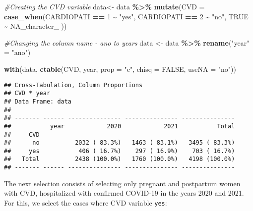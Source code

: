 \documentclass[
]{article}
\newenvironment{Shaded}{\begin{snugshade}}{\end{snugshade}}
\newcommand{\AttributeTok}[1]{\textcolor[rgb]{0.13,0.29,0.53}{#1}}
\newcommand{\CommentTok}[1]{\textcolor[rgb]{0.56,0.35,0.01}{\textit{#1}}}
\newcommand{\ConstantTok}[1]{\textcolor[rgb]{0.56,0.35,0.01}{#1}}
\newcommand{\DecValTok}[1]{\textcolor[rgb]{0.00,0.00,0.81}{#1}}
\newcommand{\FunctionTok}[1]{\textcolor[rgb]{0.13,0.29,0.53}{\textbf{#1}}}
\newcommand{\NormalTok}[1]{#1}
\newcommand{\OtherTok}[1]{\textcolor[rgb]{0.56,0.35,0.01}{#1}}
\newcommand{\SpecialCharTok}[1]{\textcolor[rgb]{0.81,0.36,0.00}{\textbf{#1}}}
\newcommand{\StringTok}[1]{\textcolor[rgb]{0.31,0.60,0.02}{#1}}
\begin{document}
\begin{Shaded}
\begin{Highlighting}[]
\CommentTok{\#Creating the CVD variable}
\NormalTok{data}\OtherTok{\textless{}{-}}\NormalTok{ data }\SpecialCharTok{\%\textgreater{}\%} 
  \FunctionTok{mutate}\NormalTok{(}\AttributeTok{CVD =} \FunctionTok{case\_when}\NormalTok{(CARDIOPATI }\SpecialCharTok{==} \DecValTok{1} \SpecialCharTok{\textasciitilde{}} \StringTok{"yes"}\NormalTok{, CARDIOPATI }\SpecialCharTok{==} \DecValTok{2} \SpecialCharTok{\textasciitilde{}} \StringTok{"no"}\NormalTok{,   }\ConstantTok{TRUE} \SpecialCharTok{\textasciitilde{}} \ConstantTok{NA\_character\_}\NormalTok{ ))}

\CommentTok{\#Changing the column name {-} ano to years}
\NormalTok{data }\OtherTok{\textless{}{-}}\NormalTok{ data }\SpecialCharTok{\%\textgreater{}\%} 
    \FunctionTok{rename}\NormalTok{(}\StringTok{"year"} \OtherTok{=} \StringTok{"ano"}\NormalTok{)}

\FunctionTok{with}\NormalTok{(data, }\FunctionTok{ctable}\NormalTok{(CVD, year, }\AttributeTok{prop =} \StringTok{"c"}\NormalTok{, }\AttributeTok{chisq =} \ConstantTok{FALSE}\NormalTok{, }\AttributeTok{useNA =} \StringTok{"no"}\NormalTok{))}
\end{Highlighting}
\end{Shaded}

\begin{verbatim}
## Cross-Tabulation, Column Proportions  
## CVD * year  
## Data Frame: data  
## 
## ------- ------ --------------- --------------- ---------------
##           year            2020            2021           Total
##     CVD                                                       
##      no          2032 ( 83.3%)   1463 ( 83.1%)   3495 ( 83.3%)
##     yes           406 ( 16.7%)    297 ( 16.9%)    703 ( 16.7%)
##   Total          2438 (100.0%)   1760 (100.0%)   4198 (100.0%)
## ------- ------ --------------- --------------- ---------------
\end{verbatim}

The next selection consists of selecting only pregnant and postpartum
women with CVD, hospitalized with confirmed COVID-19 in the years 2020
and 2021. For this, we select the cases where CVD variable \texttt{yes}:
\end{document}
